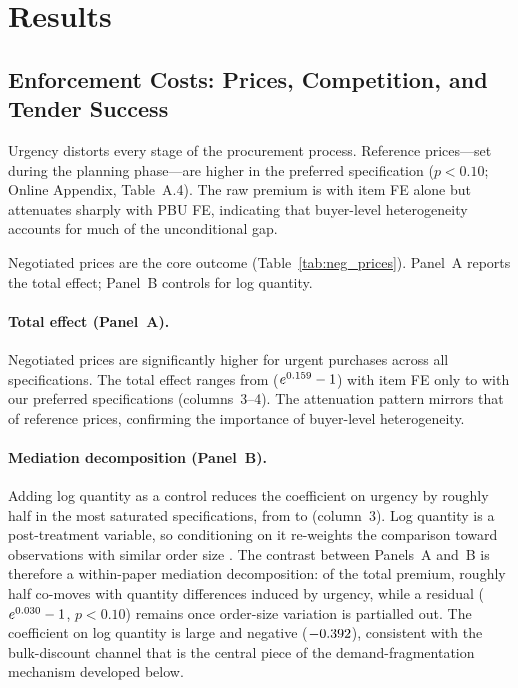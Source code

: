 \section{Results}
\label{sec:results}

\subsection{Enforcement Costs: Prices, Competition, and Tender Success}
\label{sec:main_results}

Urgency distorts every stage of the procurement process. Reference prices---set during the planning phase---are \BPrefPctPreferred{} higher in the preferred specification ($p < 0.10$; Online Appendix, Table~A.4). The raw premium is \BPrefPctItemFE{} with item FE alone but attenuates sharply with PBU FE, indicating that buyer-level heterogeneity accounts for much of the unconditional gap.

Negotiated prices are the core outcome (Table~\ref{tab:neg_prices}). Panel~A reports the total effect; Panel~B controls for log quantity.


\paragraph{Total effect (Panel~A).}
Negotiated prices are significantly higher for urgent purchases across all specifications. The total effect ranges from \BPnegPctItemFE{} ($e^{0.159}-1$) with item FE only to \BPnegPctRange{} with our preferred specifications (columns~3--4). The attenuation pattern mirrors that of reference prices, confirming the importance of buyer-level heterogeneity.

\paragraph{Mediation decomposition (Panel~B).}
Adding log quantity as a control reduces the coefficient on urgency by roughly half in the most saturated specifications, from \BPnegPanelAcoefShort{} to \BPnegPanelBcoefShort{} (column~3).\label{fn:mediation-anchor} Log quantity is a post-treatment variable, so conditioning on it re-weights the comparison toward observations with similar order size \citep{acharya2016explaining}. The contrast between Panels~A and~B is therefore a within-paper mediation decomposition: of the \BPnegPctHeadline{} total premium, roughly half co-moves with quantity differences induced by urgency, while a residual \BPnegPanelBpct{} ($e^{0.030}-1$, $p < 0.10$) remains once order-size variation is partialled out. The coefficient on log quantity is large and negative ($-0.392$), consistent with the bulk-discount channel that is the central piece of the demand-fragmentation mechanism developed below.

